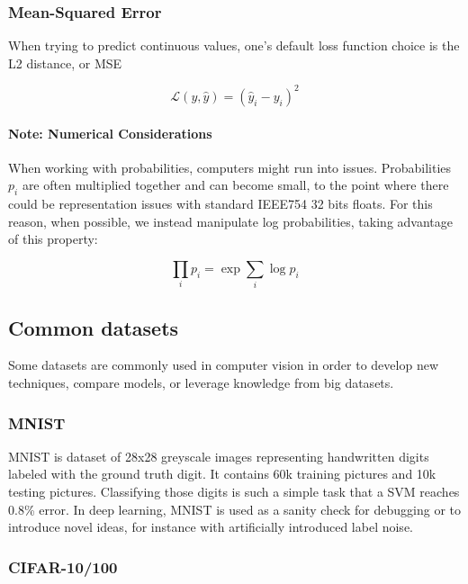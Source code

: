 \subsubsection{Mean-Squared Error}

When trying to predict continuous values, one's default loss function choice is the L2 distance, or \ac{MSE}

\begin{equation}
    \mathcal{L}(y, \hat{y}) = (\hat{y}_i - y_i)^2
\end{equation}

\paragraph{Note: Numerical Considerations} When working with probabilities, computers might run into issues. Probabilities $p_i$ are often multiplied together and can become small, to the point where there could be representation issues with standard IEEE754 32 bits floats. For this reason, when possible, we instead manipulate log probabilities, taking advantage of this property:

\begin{equation}
    \prod_i p_i = \exp \sum_i \log p_i
\end{equation}

\subsection{Common datasets}

Some datasets are commonly used in computer vision in order to develop new techniques, compare models, or leverage knowledge from big datasets.

\subsubsection{MNIST}

MNIST \citep{mnist} is dataset of 28x28 greyscale images representing handwritten digits labeled with the ground truth digit. It contains 60k training pictures and 10k testing pictures. Classifying those digits is such a simple task that a SVM reaches 0.8\% error. In deep learning, MNIST is used as a sanity check for debugging or to introduce novel ideas, for instance with artificially introduced label noise.

\subsubsection{CIFAR-10/100}
\label{cifar10}

